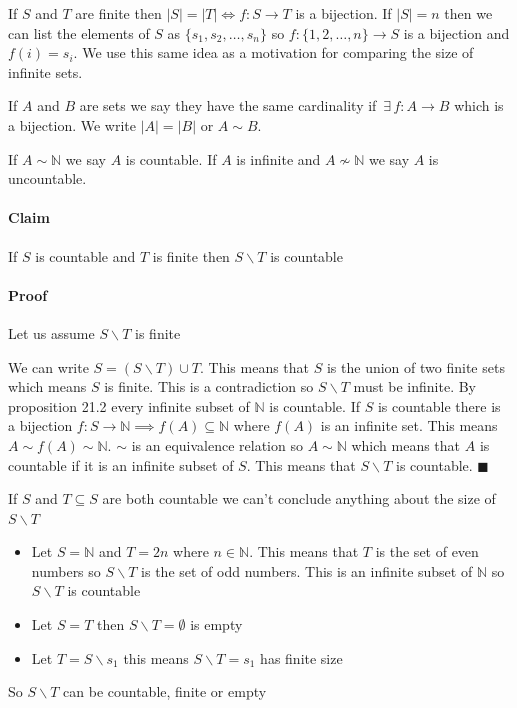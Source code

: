 \documentclass{article}
\newcommand{\bb}[1]{\mathbb{#1}}
\newcommand{\E}{\,\exists\,}
\begin{document}
If \(S\) and \(T\) are finite then \(|S|=|T|\iff f:S\to T\) is a bijection. If \(|S|=n\) then we can list the elements of \(S\) as \(\{s_1,s_2,\dotsc,s_n\}\) so \(f:\{1,2,\dotsc,n\}\to S\) is a bijection and \(f(i)=s_i\). We use this same idea as a motivation for comparing the size of infinite sets.

If \(A\) and \(B\) are sets we say they have the same cardinality if \(\E f:A\to B\) which is a bijection. We write \(|A|=|B|\) or \(A\sim B\).

If \(A\sim\bb N\) we say \(A\) is countable. If \(A\) is infinite and \(A\not\sim\bb N\) we say \(A\) is uncountable.

\paragraph{Claim} If \(S\) is countable and \(T\) is finite then \(S\backslash T\) is countable

\paragraph{Proof} Let us assume \(S\backslash T\) is finite

We can write \(S=(S\backslash T)\cup T\). This means that \(S\) is the union of two finite sets which means \(S\) is finite. This is a contradiction so \(S\backslash T\) must be infinite. By proposition 21.2 every infinite subset of \(\bb N\) is countable. If \(S\) is countable there is a bijection \(f:S\to\bb N\implies f(A)\subseteq\bb N\) where \(f(A)\) is an infinite set. This means \(A\sim f(A)\sim\bb N\). \(\sim\) is an equivalence relation so \(A\sim \bb N\) which means that \(A\) is countable if it is an infinite subset of \(S\). This means that \(S\backslash T\) is countable. \(\blacksquare\)

If \(S\) and \(T\subseteq S\) are both countable we can't conclude anything about the size of \(S\backslash T\)
\begin{itemize}
\item Let \(S=\bb N\) and \(T=2n\) where \(n\in\bb N\). This means that \(T\) is the set of even numbers so \(S\backslash T\) is the set of odd numbers. This is an infinite subset of \(\bb N\) so \(S\backslash T\) is countable

\item Let \(S=T\) then \(S\backslash T=\emptyset\) is empty

\item Let \(T=S\backslash s_1\) this means \(S\backslash T=s_1\) has finite size
\end{itemize}
So \(S\backslash T\) can be countable, finite or empty
\end{document}
